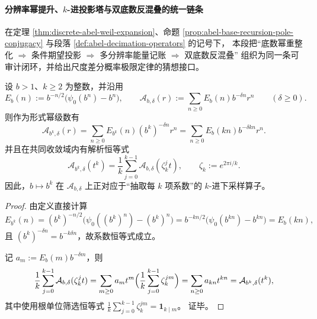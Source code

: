 \paragraph{分辨率幂提升、\(k\)-进投影塔与双底数反混叠的统一链条}\label{par:xi-discrete-abel-weil-resolution-projection-spectrum}
在定理 \ref{thm:discrete-abel-weil-expansion}、命题 \ref{prop:abel-base-recursion-pole-conjugacy}
与段落 \ref{def:abel-decimation-operators} 的记号下，
本段把“底数幂重整化 \(\Rightarrow\) 条件期望投影 \(\Rightarrow\) 多分辨率能量记账 \(\Rightarrow\) 双底数反混叠”
组织为同一条可审计闭环，并给出尺度差分概率极限定律的猜想接口。

\begin{theorem}\label{thm:abel-resolution-power-renormalization-identity}
设 \(b>1\)、\(k\ge 2\) 为整数，并沿用
\[
E_b(n):=b^{-n/2}\bigl(\psi_0(b^n)-b^n\bigr),\qquad
\mathcal A_{b,\delta}(r):=\sum_{n\ge 0}E_b(n)b^{-\delta n}r^n\qquad(\delta\ge 0).
\]
则作为形式幂级数有
\[
\mathcal A_{b^k,\delta}(r)=\sum_{n\ge 0}E_{b^k}(n)(b^k)^{-\delta n}r^n
=\sum_{n\ge 0}E_b(kn)b^{-\delta kn}r^n.
\]
并且在共同收敛域内有解析恒等式
\begin{equation}\label{eq:abel-resolution-power-renormalization-identity}
\boxed{\;
\mathcal A_{b^k,\delta}(t^k)=\frac1k\sum_{j=0}^{k-1}\mathcal A_{b,\delta}(\zeta_k^j t),\qquad
\zeta_k:=e^{2\pi i/k}.\;}
\end{equation}
因此，\(b\mapsto b^k\) 在 \(\mathcal A_{b,\delta}\) 上正对应于“抽取每 \(k\) 项系数”的 \(k\)-进下采样算子。
\end{theorem}

\begin{proof}
由定义直接计算
\[
E_{b^k}(n)
=(b^k)^{-n/2}\bigl(\psi_0((b^k)^n)-(b^k)^n\bigr)
=b^{-kn/2}\bigl(\psi_0(b^{kn})-b^{kn}\bigr)
=E_b(kn),
\]
且 \((b^k)^{-\delta n}=b^{-k\delta n}\)，故系数恒等式成立。

记 \(a_m:=E_b(m)b^{-\delta m}\)，则
\[
\frac1k\sum_{j=0}^{k-1}\mathcal A_{b,\delta}(\zeta_k^j t)
=\sum_{m\ge 0}a_m t^m\Bigl(\frac1k\sum_{j=0}^{k-1}\zeta_k^{jm}\Bigr)
=\sum_{n\ge 0}a_{kn}t^{kn}
=\mathcal A_{b^k,\delta}(t^k),
\]
其中使用根单位筛选恒等式
\(
\frac1k\sum_{j=0}^{k-1}\zeta_k^{jm}=\mathbf 1_{k\mid m}
\)。
证毕。
\end{proof}

